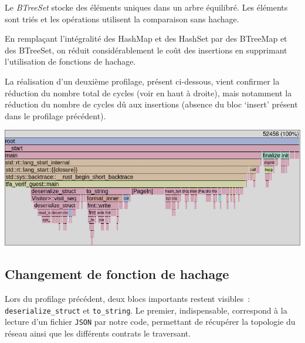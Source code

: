 \documentclass[12pt]{report}
\begin{document}
Le \textit{BTreeSet} stocke des éléments uniques dans un arbre 
équilibré. Les éléments sont triés et les opérations utilisent 
la comparaison sans hachage.

\vspace{0.3cm}
\begin{center}
\end{center}

\medskip

En remplaçant l'intégralité des HashMap et des HashSet par des
BTreeMap et des BTreeSet, on réduit considérablement le coût
des insertions en supprimant l'utilisation de fonctions de
hachage.

\medskip

La réalisation d'un deuxième profilage, présent ci-dessous, vient confirmer la réduction
du nombre total de cycles (voir en haut à droite), mais notamment
la réduction du nombre de cycles dû aux insertions (absence du bloc
`insert' présent dans le profilage précédent).

\begin{center}
  \includegraphics[width=1\textwidth]{flamegraph_2.png}
\end{center}

\break{}

\subsection{Changement de fonction de hachage}

Lors du profilage précédent, deux blocs importants restent 
visibles~: \texttt{deserialize\_struct} et \texttt{to\_string}. 
Le premier, indispensable, correspond à la lecture d'un fichier 
\texttt{JSON} par notre code, permettant de récupérer la topologie 
du réseau ainsi que les différents contrats le traversant.
\end{document}
